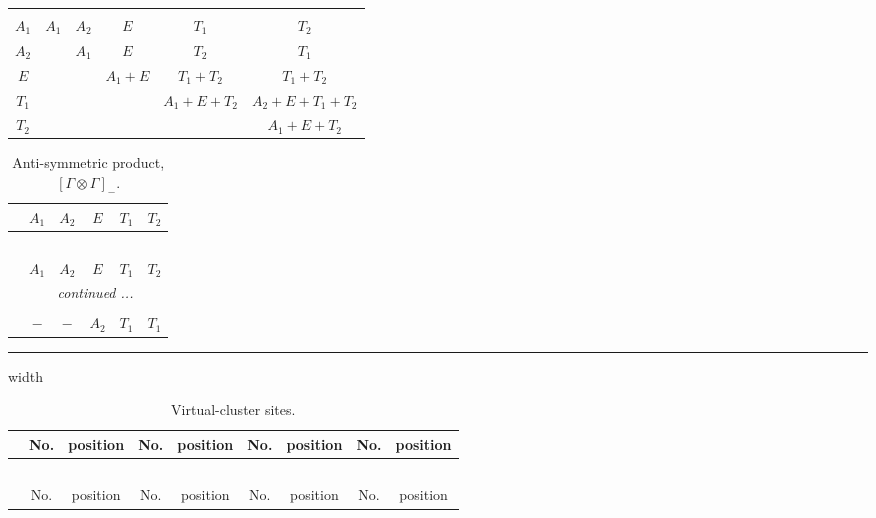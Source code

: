 \documentclass[fleqn,10pt,landscape]{article}
\begin{document}
\begin{itemize}
\begin{center}
\begin{longtable}{c|ccccc}
 \hline \hline
\multicolumn{5}{r}{} \\ \endlastfoot

$ A_{1} $ & $ A_{1} $ & $ A_{2} $ & $ E $ & $ T_{1} $ & $ T_{2} $ \\
$ A_{2} $ & $  $ & $ A_{1} $ & $ E $ & $ T_{2} $ & $ T_{1} $ \\
$ E $ & $  $ & $  $ & $ A_{1} + E $ & $ T_{1} + T_{2} $ & $ T_{1} + T_{2} $ \\
$ T_{1} $ & $  $ & $  $ & $  $ & $ A_{1} + E + T_{2} $ & $ A_{2} + E + T_{1} + T_{2} $ \\
$ T_{2} $ & $  $ & $  $ & $  $ & $  $ & $ A_{1} + E + T_{2} $ \\
\end{longtable}
\end{center}
\begin{center}
\renewcommand{\arraystretch}{1.0}
\begin{longtable}{cccccc}
\caption{Anti-symmetric product, $[\Gamma\otimes\Gamma]_-$.}
 \\
 \hline \hline
 & $ A_{1} $ & $ A_{2} $ & $ E $ & $ T_{1} $ & $ T_{2} $ \\ \hline \endfirsthead

\multicolumn{5}{l}{\tablename\ \thetable{}} \\
 \hline \hline
 & $ A_{1} $ & $ A_{2} $ & $ E $ & $ T_{1} $ & $ T_{2} $ \\ \hline \endhead

 \hline \hline
\multicolumn{5}{r}{\footnotesize\it continued ...} \\ \endfoot

 \hline \hline
\multicolumn{5}{r}{} \\ \endlastfoot

$  $ & $ - $ & $ - $ & $ A_{2} $ & $ T_{1} $ & $ T_{1} $ \\
\end{longtable}
\end{center}

 \hfil \hrule height 1mm width \textwidth \hfil

{
\scriptsize
\begin{center}
\renewcommand{\arraystretch}{1.7}
\begin{longtable}{ccccccccc}
\caption{Virtual-cluster sites.}
 \\
 \hline \hline
 & No. & position & No. & position & No. & position & No. & position \\ \hline \endfirsthead

\multicolumn{8}{l}{\tablename\ \thetable{}} \\
 \hline \hline
 & No. & position & No. & position & No. & position & No. & position \\ \hline \endhead


\end{longtable}
\end{center}}
\end{itemize}
\end{document}

